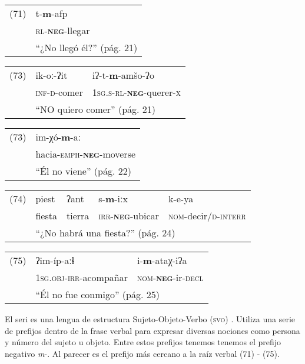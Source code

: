 {\setmainfont{Charis SIL} 

\begin{tabular}{ll}
(71) & t-\textbf{m}-afp \\
& \textsc{rl}-\textsc{\textbf{neg}}-llegar \\
& ``¿No llegó él?'' (pág. 21)
\end{tabular} \vspace{0.5cm}

\begin{tabular}{lll}
(73) & ik-oː-ʔit & iʔ-t-\textbf{m}-amšo-ʔo \\
& \textsc{inf-d}-comer & \textsc{1sg.s-rl-\textbf{neg}-}querer-\textsc{x} \\
& \multicolumn{2}{l}{``NO quiero comer'' (pág. 21)}
\end{tabular} \vspace{0.5cm}

\begin{tabular}{ll}
(73) & im-χó-\textbf{m}-aː \\
& hacia-\textsc{emph-\textbf{neg}}-moverse \\
& ``Él no viene'' (pág. 22)
\end{tabular} \vspace{0.5cm}

\begin{tabular}{lllll}
(74) & piest & ʔant & s-\textbf{m}-iːx & k-e-ya  \\
& fiesta & tierra & \textsc{irr-\textbf{neg}}-ubicar & \textsc{nom}-decir/\textsc{d-interr} \\
& \multicolumn{4}{l}{``¿No habrá una fiesta?'' (pág. 24)}
\end{tabular} \vspace{0.5cm}

\begin{tabular}{lll}
(75) & ʔim-íp-aːɬ & i-\textbf{m}-ataχ-iʔa \\
& \textsc{1sg.obj-irr}-acompañar & \textsc{nom-\textbf{neg}-}ir-\textsc{decl}\\
& \multicolumn{2}{l}{``Él no fue conmigo'' (pág. 25)}
\end{tabular} \vspace{0.5cm}

}

El seri es una lengua de estructura Sujeto-Objeto-Verbo (\textsc{svo}) \textcolor{MidnightBlue}{\citep{Seri}}. Utiliza una serie de prefijos dentro de la frase verbal para expresar diversas nociones como persona y número del sujeto u objeto. Entre estos prefijos tenemos tenemos el prefijo negativo {\setmainfont{Charis SIL} \textit{m}-}. Al parecer es el prefijo más cercano a la raíz verbal (71) - (75).